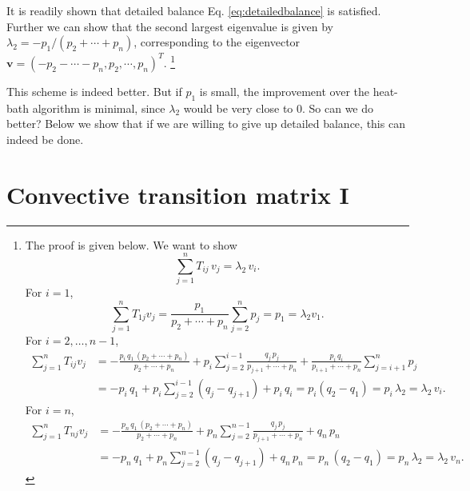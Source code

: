 \documentclass[12pt]{article}
\begin{document}
It is readily shown that detailed balance Eq. \eqref{eq:detailedbalance} is satisfied.
Further we can show that the second largest eigenvalue
is given by $\lambda_2 = -p_1/(p_2 + \cdots + p_n)$,
corresponding to the eigenvector
$\mathbf v = (-p_2 - \cdots - p_n, p_2, \cdots, p_n)^T$.
\footnote{
The proof is given below. We want to show
$$
\sum_{j = 1}^n T_{ij} \, v_j = \lambda_2 \, v_i.
$$
For $i = 1$,
$$
\sum_{j=1}^n T_{1j} v_j =
\frac{ p_1 } { p_2 + \cdots + p_n } \sum_{j=2}^n p_j
= p_1
= \lambda_2 v_1.
$$
For $i = 2, \dots, n-1$,
$$
\begin{aligned}
\sum_{j=1}^n T_{ij} v_j
&=
-\frac{ p_i \, q_1 \, (p_2 + \cdots + p_n) } { p_{2} + \cdots + p_n }
+p_i \sum_{j = 2}^{i-1} \frac{ q_j \, p_j } { p_{j+1} + \cdots + p_n }
+\frac{ p_i \, q_i } { p_{i+1} + \cdots + p_n } \sum_{j=i+1}^n p_j \\
&=
-p_i \, q_1
+ p_i \sum_{j = 2}^{i-1} (q_j - q_{j+1})
+p_i \, q_i
=p_i (q_2 - q_1) = p_i \, \lambda_2 = \lambda_2 \, v_i.
\end{aligned}
$$
For $i = n$,
$$
\begin{aligned}
\sum_{j=1}^n T_{nj} v_j
&=
-\frac{ p_n \, q_1 \, (p_2 + \cdots + p_n) } { p_{2} + \cdots + p_n }
+p_n \sum_{j = 2}^{n-1} \frac{ q_j \, p_j } { p_{j+1} + \cdots + p_n }
+q_n \, p_n \\
&=
-p_n \, q_1
+p_n \sum_{j = 2}^{n-1} (q_j - q_{j+1})
+q_n \, p_n
=p_n \, (q_2 - q_1) = p_n \, \lambda_2 = \lambda_2 \, v_n.
\end{aligned}
$$
}

This scheme is indeed better.
But if $p_1$ is small,
the improvement over the heat-bath algorithm is minimal,
since $\lambda_2$ would be very close to $0$.
So can we do better?
%
Below we show that
if we are willing to give up detailed balance,
this can indeed be done.



\section{\label{sec:convective1}
Convective transition matrix I}
\end{document}
